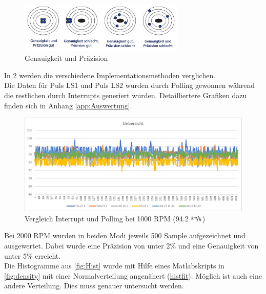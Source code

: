 \begin{figure}[ht]
    \centering
    \includegraphics[width=0.7\textwidth]{images/testingtips}
    \caption{Genauigkeit und Präzision}
    \label{fig:GenauPraz}
\end{figure}
\clearpage

In \ref{fig:AuswertungInt}  werden die verschiedene Implementationsmethoden verglichen.\\

Die Daten für Puls LS1 und Puls LS2 wurden durch Polling gewonnen während die restlichen durch Interrupts generiert wurden. Detailliertere Grafiken dazu finden sich in Anhang \ref{app:Auswertung}.
\begin{figure}[ht]
    \centering
    	\includegraphics[width=\textwidth]{images/auswertungInt.png}
    \caption{Vergleich Interrupt und Polling bei 1000 RPM (94.2 $\nicefrac{km}{h}$)}
    \label{fig:AuswertungInt}
\end{figure}


Bei 2000 RPM wurden in beiden Modi jeweils 500 Sample aufgezeichnet und ausgewertet. Dabei wurde eine Präzision von unter 2\% und eine Genauigkeit von unter 5\% erreicht.\\
Die Histogramme aus \ref{fig:Hist} wurde mit Hilfe eines Matlabskripts in \ref{fig:density} mit einer Normalverteilung angenähert (\href{https://ch.mathworks.com/help/stats/histfit.html}{histfit}). Möglich ist auch eine andere Verteilung. Dies muss genauer untersucht werden.


